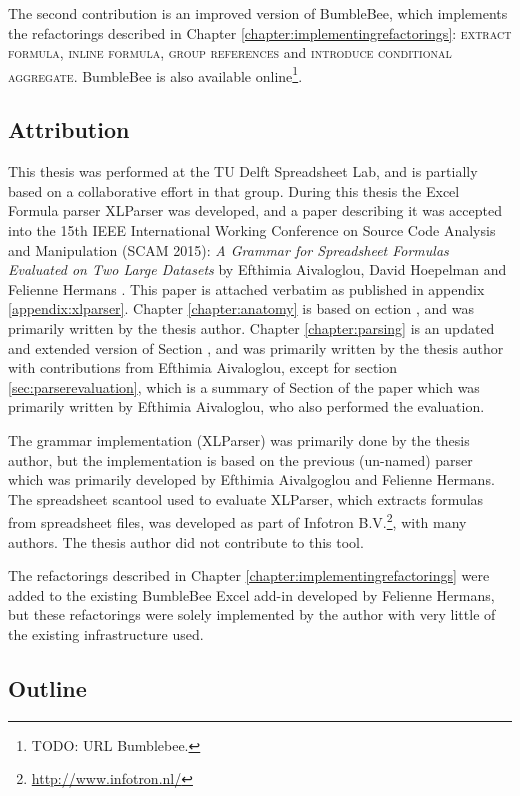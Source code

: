 \documentclass[12pt,a4paper,onecolumn,oneside,parskip]{memoir}
\newcommand{\rf}[1]{\textsc{\lowercase{#1}}}
\newcommand{\rom}[1]{\uppercase\expandafter{\romannumeral #1\relax}}
\begin{document}
The second contribution is an improved version of BumbleBee, which implements the refactorings described in Chapter \ref{chapter:implementingrefactorings}: \rf{Extract Formula}, \rf{Inline Formula}, \rf{Group References} and \rf{Introduce Conditional Aggregate}.
BumbleBee is also available online\footnote{TODO: URL Bumblebee.}.

\subsection{Attribution}

This thesis was performed at the TU Delft Spreadsheet Lab, and is partially based on a collaborative effort in that group.
During this thesis the Excel Formula parser XLParser was developed, and a paper describing it was accepted into the 15th IEEE International Working Conference on Source Code Analysis and Manipulation (SCAM 2015): \emph{A Grammar for Spreadsheet Formulas Evaluated on Two Large Datasets} by Efthimia Aivaloglou, David Hoepelman and Felienne Hermans \cite{xlparser}.
This paper is attached verbatim as published in appendix \ref{appendix:xlparser}.
Chapter \ref{chapter:anatomy} is based on ection \rom{2}, and was primarily written by the thesis author.
Chapter \ref{chapter:parsing} is an updated and extended version of Section \rom{3}, and was primarily written by the thesis author with contributions from Efthimia Aivaloglou, except for section \ref{sec:parserevaluation}, which is a summary of Section \rom{4} of the paper which was primarily written by Efthimia Aivaloglou, who also performed the evaluation. 

The grammar implementation (XLParser) was primarily done by the thesis author, but the implementation is based on the previous (un-named) parser which was primarily developed by Efthimia Aivalgoglou and Felienne Hermans.
The spreadsheet scantool used to evaluate XLParser, which extracts formulas from spreadsheet files, was developed as part of Infotron B.V.\footnote{\url{http://www.infotron.nl/}}, with many authors. The thesis author did not contribute to this tool.

The refactorings described in Chapter \ref{chapter:implementingrefactorings} were added to the existing BumbleBee Excel add-in developed by Felienne Hermans, but these refactorings were solely implemented by the author with very little of the existing infrastructure used.

\subsection{Outline}
\end{document}
